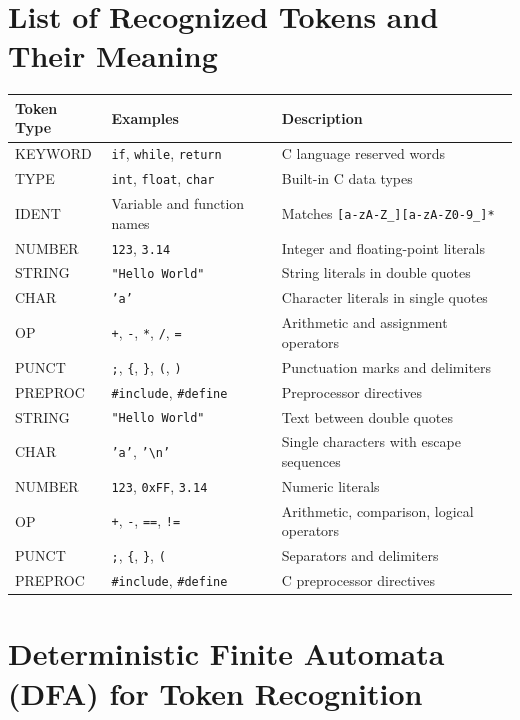 \documentclass[12pt]{article}
\begin{document}
\section{List of Recognized Tokens and Their Meaning}

\begin{center}
\begin{tabular}{|l|l|l|}
\hline
\textbf{Token Type} & \textbf{Examples} & \textbf{Description} \\
\hline
KEYWORD & \texttt{if}, \texttt{while}, \texttt{return} & C language reserved words \\
\hline
TYPE & \texttt{int}, \texttt{float}, \texttt{char} & Built-in C data types \\
\hline
IDENT & Variable and function names & Matches \texttt{[a-zA-Z\_][a-zA-Z0-9\_]*} \\
\hline
NUMBER & \texttt{123}, \texttt{3.14} & Integer and floating-point literals \\
\hline
STRING & \texttt{"Hello World"} & String literals in double quotes \\
\hline
CHAR & \texttt{'a'} & Character literals in single quotes \\
\hline
OP & \texttt{+}, \texttt{-}, \texttt{*}, \texttt{/}, \texttt{=} & Arithmetic and assignment operators \\
\hline
PUNCT & \texttt{;}, \texttt{\{}, \texttt{\}}, \texttt{(}, \texttt{)} & Punctuation marks and delimiters \\
\hline
PREPROC & \texttt{\#include}, \texttt{\#define} & Preprocessor directives \\
\hline
STRING & \texttt{"Hello World"} & Text between double quotes \\
\hline
CHAR & \texttt{'a'}, \texttt{'\textbackslash n'} & Single characters with escape sequences \\
\hline
NUMBER & \texttt{123}, \texttt{0xFF}, \texttt{3.14} & Numeric literals \\
\hline
OP & \texttt{+}, \texttt{-}, \texttt{==}, \texttt{!=} & Arithmetic, comparison, logical operators \\
\hline
PUNCT & \texttt{;}, \texttt{\{}, \texttt{\}}, \texttt{(} & Separators and delimiters \\
\hline
PREPROC & \texttt{\#include}, \texttt{\#define} & C preprocessor directives \\
\hline
\end{tabular}
\end{center}
\section{Deterministic Finite Automata (DFA) for Token Recognition}
\end{document}
